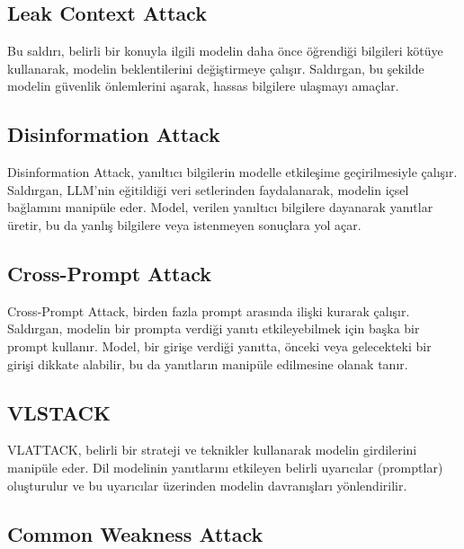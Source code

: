 \newpage

\subsection{Leak Context Attack}

Bu saldırı, belirli bir konuyla ilgili modelin daha önce öğrendiği bilgileri kötüye kullanarak, modelin beklentilerini değiştirmeye çalışır. Saldırgan, bu şekilde modelin güvenlik önlemlerini aşarak, hassas bilgilere ulaşmayı amaçlar.

\newpage

\subsection{Disinformation Attack}

Disinformation Attack, yanıltıcı bilgilerin modelle etkileşime geçirilmesiyle çalışır. Saldırgan, LLM'nin eğitildiği veri setlerinden faydalanarak, modelin içsel bağlamını manipüle eder. Model, verilen yanıltıcı bilgilere dayanarak yanıtlar üretir, bu da yanlış bilgilere veya istenmeyen sonuçlara yol açar.

\newpage

\subsection{Cross-Prompt Attack}

Cross-Prompt Attack, birden fazla prompt arasında ilişki kurarak çalışır. Saldırgan, modelin bir prompta verdiği yanıtı etkileyebilmek için başka bir prompt kullanır. Model, bir girişe verdiği yanıtta, önceki veya gelecekteki bir girişi dikkate alabilir, bu da yanıtların manipüle edilmesine olanak tanır.

\newpage

\subsection{VLSTACK}

VLATTACK, belirli bir strateji ve teknikler kullanarak modelin girdilerini manipüle eder. Dil modelinin yanıtlarını etkileyen belirli uyarıcılar (promptlar) oluşturulur ve bu uyarıcılar üzerinden modelin davranışları yönlendirilir.

\newpage

\subsection{Common Weakness Attack}


